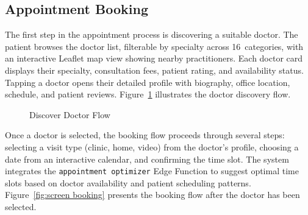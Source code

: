 \documentclass[12pt,a4paper,oneside]{report}
\begin{document}
\subsection{Appointment Booking}

The first step in the appointment process is discovering a suitable doctor. The patient browses the doctor list, filterable by specialty across 16~categories, with an interactive Leaflet map view showing nearby practitioners. Each doctor card displays their specialty, consultation fees, patient rating, and availability status. Tapping a doctor opens their detailed profile with biography, office location, schedule, and patient reviews. Figure~\ref{fig:screen discover doctor} illustrates the doctor discovery flow.

\begin{figure}[H]
    \centering
    \begin{minipage}{0.32\textwidth}
        \centering
    \end{minipage}\hfill
    \begin{minipage}{0.32\textwidth}
        \centering
    \end{minipage}\hfill
    \begin{minipage}{0.32\textwidth}
        \centering
    \end{minipage}
    \caption{Discover Doctor Flow}
    \label{fig:screen discover doctor}
\end{figure}

Once a doctor is selected, the booking flow proceeds through several steps: selecting a visit type (clinic, home, video) from the doctor's profile, choosing a date from an interactive calendar, and confirming the time slot. The system integrates the \texttt{appointment optimizer} Edge Function to suggest optimal time slots based on doctor availability and patient scheduling patterns. Figure~\ref{fig:screen booking} presents the booking flow after the doctor has been selected.
\end{document}
